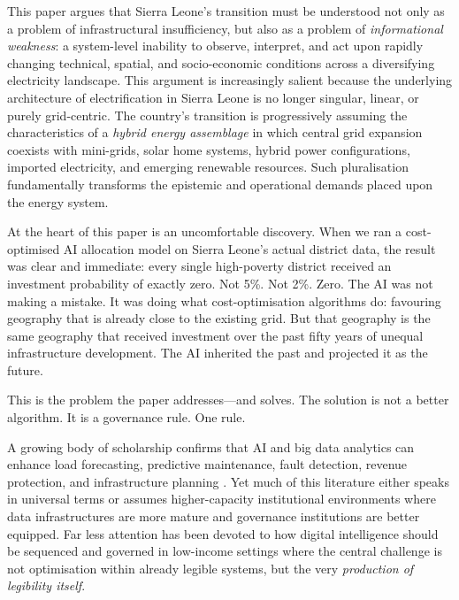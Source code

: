 \documentclass[preprint,12pt]{elsarticle}
\begin{document}
This paper argues that Sierra Leone's transition must be
understood not only as a problem of infrastructural insufficiency,
but also as a problem of \textit{informational weakness}: a
system-level inability to observe, interpret, and act upon
rapidly changing technical, spatial, and socio-economic conditions
across a diversifying electricity landscape. This argument is
increasingly salient because the underlying architecture of
electrification in Sierra Leone is no longer singular, linear,
or purely grid-centric. The country's transition is progressively
assuming the characteristics of a \textit{hybrid energy assemblage}
in which central grid expansion coexists with mini-grids, solar
home systems, hybrid power configurations, imported electricity,
and emerging renewable resources. Such pluralisation fundamentally
transforms the epistemic and operational demands placed upon the
energy system.

At the heart of this paper is an uncomfortable discovery.
When we ran a cost-optimised AI allocation model on Sierra Leone's
actual district data, the result was clear and immediate: every
single high-poverty district received an investment probability
of exactly zero. Not 5\%. Not 2\%. Zero. The AI was not making
a mistake. It was doing what cost-optimisation algorithms do:
favouring geography that is already close to the existing grid.
But that geography is the same geography that received investment
over the past fifty years of unequal infrastructure development.
The AI inherited the past and projected it as the future.

This is the problem the paper addresses---and solves. The solution
is not a better algorithm. It is a governance rule. One rule.

A growing body of scholarship confirms that AI and big data
analytics can enhance load forecasting, predictive maintenance,
fault detection, revenue protection, and infrastructure planning
\cite{Ahmad2021, Arevalo2024, Chatterjee2022, Yousef2023}. Yet
much of this literature either speaks in universal terms or
assumes higher-capacity institutional environments where data
infrastructures are more mature and governance institutions are
better equipped. Far less attention has been devoted to how
digital intelligence should be sequenced and governed in
low-income settings where the central challenge is not optimisation
within already legible systems, but the very \textit{production
of legibility itself}.
\end{document}
